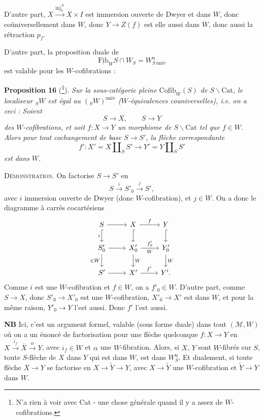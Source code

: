 \documentclass[11pt]{article}
\newcommand{\printedpage}[1]{\marginpar{\footnotesize p.~#1}}
\newcommand{\msp}[1]{\marginpar{\footnotesize [#1]}}
\begin{document}
D'autre part, $X \xrightarrow{\mathrm{inj}_0^X} X \times I$ est immersion ouverte de Dwyer et dans $W$, donc coüniversellement dans $W$, donc $Y \longrightarrow Z(f)$ est elle aussi dans $W$, donc aussi la rétraction $p_f$.

D'autre part, la proposition duale de
\[
\underline{\mathrm{Fib}}_W S \cap W_S = W^{\mathrm{u}}_{S\,\mathrm{univ}}
\]
est valable pour les $W$-cofibrations :

\msp{page 231}
\textbf{Proposition 16} (\footnote[125]{N'a rien à voir avec Cat - une chose générale quand il y a assez de $W$-cofibrations.}). \textit{Sur la sous-catégorie pleine $\underline{\mathrm{Cofib}}_W(S)$ de $S\backslash\mathrm{Cat}$, le localiseur ${}_SW$ est égal au $({}_SW)^{\mathrm{univ}}$ ($W$-équivalences couniverselles), i.e. on a ceci : Soient}
\[
S \longrightarrow X, \qquad S \longrightarrow Y
\]
\textit{des $W$-cofibrations, et soit $f : X \longrightarrow Y$ un morphisme de $S\backslash\mathrm{Cat}$ tel que $f \in W$. Alors pour tout cochangement de base $S \longrightarrow S'$, la flèche correspondante}
\[
f' : X' = X \amalg_S S' \longrightarrow Y' = Y \amalg_S S'
\]
\textit{est dans $W$.}

\textsc{Démonstration}. On factorise $S \longrightarrow S'$ en
\[
S \xrightarrow{i} S'_0 \xrightarrow{j} S',
\]
avec $i$ immersion ouverte de Dwyer (donc $W$-cofibration), et $j \in W$. On a donc le diagramme à carrés cocartésiens
\[
\begin{tikzcd}
S \arrow[r] \arrow[d, hook, "i"'] & X \arrow[r, "f"] \arrow[d, hook] & Y \arrow[d, hook] \\
S'_0 \arrow[r] \arrow[d, "\in W"'] & X'_0 \arrow[r, "f'_0", "W"'] \arrow[d, "W"] & Y'_0 \arrow[d, "W"] \\
S' \arrow[r] & X' \arrow[r, "f'"] & Y'.
\end{tikzcd}
\]
Comme $i$ est une $W$-cofibration et $f \in W$, on a $f'_0 \in W$. D'autre part, comme $S \longrightarrow X$, donc $S'_0 \longrightarrow X'_0$ est
\printedpage{148}
\msp{page 232}
une $W$-cofibration, $X'_0 \longrightarrow X'$ est dans $W$, et pour la même raison, $Y'_0 \longrightarrow Y$ l'est aussi. Donc $f'$ l'est aussi. %

\textbf{NB} Ici, c'est un argument formel, valable (sous forme duale) dans tout $(\mathcal{M}, W)$ où on a un énoncé de factorisation pour une flèche quelconque $f : X \longrightarrow Y$ en $X \xrightarrow{i_f} \bar{X} \xrightarrow{\alpha} Y$, avec $i_f \in W$ et $\alpha$ une $W$-fibration. Alors, si $X$, $Y$ sont $W$-fibrés sur $S$, toute $S$-flèche de $X$ dans $Y$ qui est dans $W$, est dans $W^{\mathrm{u}}_S$. Et dualement, si toute flèche $X \longrightarrow Y$ se factorise en $X \longrightarrow \tilde{Y} \longrightarrow Y$, avec $X \longrightarrow \tilde{Y}$ une $W$-cofibration et $\tilde{Y} \longrightarrow Y$ dans $W$.
\end{document}
